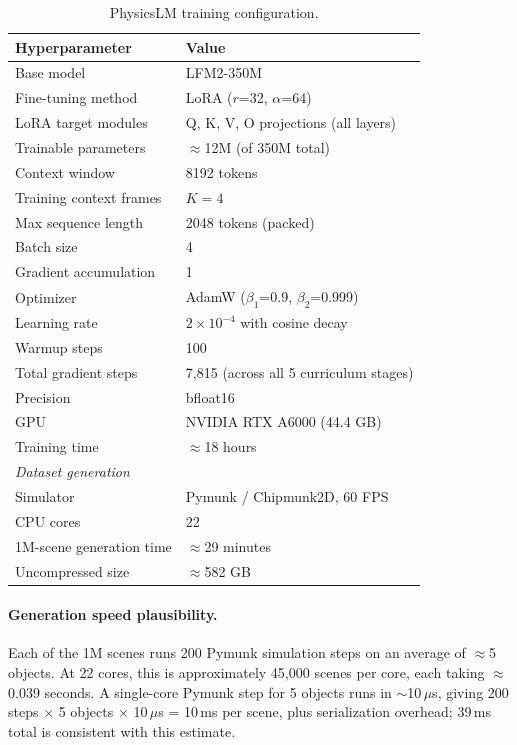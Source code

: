 \documentclass{article}
\begin{document}
\begin{table}[h]
\centering
\caption{PhysicsLM training configuration.}
\small
\begin{tabular}{ll}
\toprule
\textbf{Hyperparameter} & \textbf{Value} \\
\midrule
Base model              & LFM2-350M \\
Fine-tuning method      & LoRA ($r$=32, $\alpha$=64) \\
LoRA target modules     & Q, K, V, O projections (all layers) \\
Trainable parameters    & $\approx$12M (of 350M total) \\
Context window          & 8192 tokens \\
Training context frames & $K=4$ \\
Max sequence length     & 2048 tokens (packed) \\
Batch size              & 4 \\
Gradient accumulation   & 1 \\
Optimizer               & AdamW ($\beta_1$=0.9, $\beta_2$=0.999) \\
Learning rate           & $2\times10^{-4}$ with cosine decay \\
Warmup steps            & 100 \\
Total gradient steps    & 7,815 (across all 5 curriculum stages) \\
Precision               & bfloat16 \\
GPU                     & NVIDIA RTX A6000 (44.4 GB) \\
Training time           & $\approx$18 hours \\
\midrule
\multicolumn{2}{l}{\textit{Dataset generation}} \\
Simulator               & Pymunk / Chipmunk2D, 60 FPS \\
CPU cores               & 22 \\
1M-scene generation time & $\approx$29 minutes \\
Uncompressed size       & $\approx$582 GB \\
\bottomrule
\end{tabular}
\end{table}

\paragraph{Generation speed plausibility.}
Each of the 1M scenes runs 200 Pymunk simulation steps on an average of
$\approx$5 objects. At 22 cores, this is approximately 45,000 scenes per core,
each taking $\approx$0.039 seconds. A single-core Pymunk step for 5 objects
runs in $\sim$10\,$\mu$s, giving 200 steps $\times$ 5 objects $\times$ 10\,$\mu$s
= 10\,ms per scene, plus serialization overhead; 39\,ms total is consistent with
this estimate.
\end{document}
